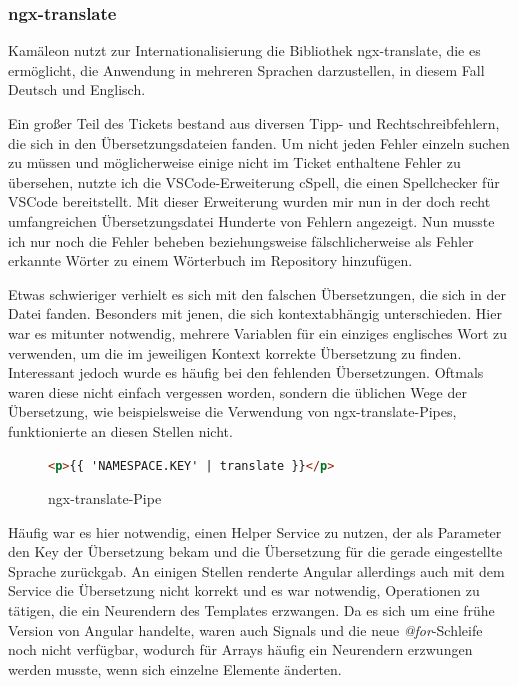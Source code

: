 \documentclass[11pt, a4paper, oneside]{scrartcl}
\begin{document}
            \subsubsection{ngx-translate}
            Kamäleon nutzt zur Internationalisierung die Bibliothek ngx-translate, die es
            ermöglicht, die Anwendung in mehreren Sprachen darzustellen, in diesem Fall Deutsch und
            Englisch.\par
            Ein großer Teil des Tickets bestand aus diversen Tipp- und Rechtschreibfehlern, die sich
            in den Übersetzungsdateien fanden.
            Um nicht jeden Fehler einzeln suchen zu müssen und möglicherweise einige nicht im
            Ticket enthaltene Fehler zu übersehen, nutzte ich die VSCode-Erweiterung cSpell, die
            einen Spellchecker für VSCode bereitstellt.
            Mit dieser Erweiterung wurden mir nun in der doch recht umfangreichen Übersetzungsdatei
            Hunderte von Fehlern angezeigt.
            Nun musste ich nur noch die Fehler beheben beziehungsweise fälschlicherweise als Fehler
            erkannte Wörter zu einem Wörterbuch im Repository hinzufügen.\par
            Etwas schwieriger verhielt es sich mit den falschen Übersetzungen, die sich in der Datei
            fanden.
            Besonders mit jenen, die sich kontextabhängig unterschieden.
            Hier war es mitunter notwendig, mehrere Variablen für ein einziges englisches Wort zu
            verwenden, um die im jeweiligen Kontext korrekte Übersetzung zu finden.
            Interessant jedoch wurde es häufig bei den fehlenden Übersetzungen.
            Oftmals waren diese nicht einfach vergessen worden, sondern die üblichen Wege der
            Übersetzung, wie beispielsweise die Verwendung von ngx-translate-Pipes, funktionierte an
            diesen Stellen nicht.\par
            \begin{figure}[h!]
                \centering
                \begin{lstlisting}[language=HTML, frame=single, basicstyle=\ttfamily\small]
                    <p>{{ 'NAMESPACE.KEY' | translate }}</p>
                \end{lstlisting}
                \caption{ngx-translate-Pipe}
            \end{figure}
            Häufig war es hier notwendig, einen Helper Service zu nutzen, der als Parameter den Key
            der Übersetzung bekam und die Übersetzung für die gerade eingestellte Sprache zurückgab.
            An einigen Stellen renderte Angular allerdings auch mit dem Service die Übersetzung
            nicht korrekt und es war notwendig, Operationen zu tätigen, die ein Neurendern des
            Templates erzwangen.
            Da es sich um eine frühe Version von Angular handelte, waren auch Signals und die neue
            \textit{@for}-Schleife noch nicht verfügbar, wodurch für Arrays häufig ein Neurendern
            erzwungen werden musste, wenn sich einzelne Elemente änderten.
\end{document}
